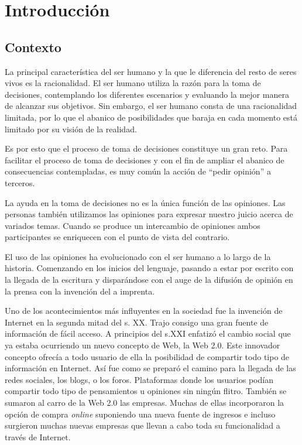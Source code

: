 
\chapter{Introducción} \label{intro}
	
	\section{Contexto} \label{context}
	
	
	La principal característica del ser humano y la que le diferencia del resto de seres vivos es la racionalidad. El ser humano utiliza la razón para la toma de decisiones, contemplando los diferentes escenarios y evaluando la mejor manera de alcanzar sus objetivos. Sin embargo, el ser humano consta de una racionalidad limitada, por lo que el abanico de posibilidades que baraja en cada momento está limitado por su visión de la realidad. 
	
	Es por esto que el proceso de toma de decisiones constituye un gran reto. Para facilitar el proceso de toma de decisiones y con el fin de ampliar el abanico de consecuencias contempladas, es muy común la acción de ``pedir opinión'' a terceros.
	
	 La ayuda en la toma de decisiones no es la única función de las opiniones. Las personas también utilizamos las opiniones para expresar nuestro juicio acerca de variados temas. Cuando se produce un intercambio de opiniones ambos participantes se enriquecen con el punto de vista del contrario. 
	 
	El uso de las opiniones ha evolucionado con el ser humano a lo largo de la historia. Comenzando en los inicios del lenguaje, pasando a estar por escrito con la llegada de la escritura y disparándose con el auge de la difusión de opinión en la prensa con la invención del a imprenta.
	
	Uno de los acontecimientos más influyentes en la sociedad fue la invención de Internet en la segunda mitad del s. XX. Trajo consigo una gran fuente de información de fácil acceso. A principios del s.XXI enfatizó el cambio social que ya estaba ocurriendo un nuevo concepto de Web, la Web 2.0. Este innovador concepto ofrecía a todo usuario de ella la posibilidad de compartir todo tipo de información en Internet. Así fue como se preparó el camino para la llegada de las redes sociales, los blogs, o los foros. Plataformas donde los usuarios podían compartir todo tipo de pensamientos u opiniones sin ningún flitro. También se sumaron al carro de la Web 2.0 las empresas. Muchas de ellas incorporaron la opción de compra \textit{online} suponiendo una nueva fuente de ingresos e incluso surgieron muchas nuevas empresas que llevan a cabo toda su funcionalidad a través de Internet.
	
